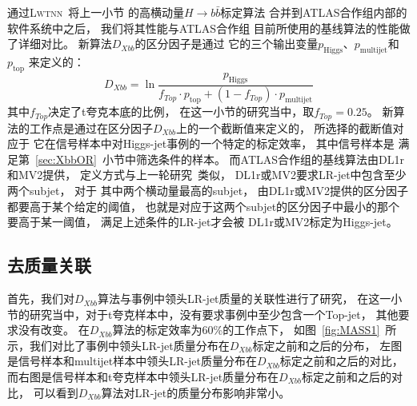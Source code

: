 通过\textsc{Lwtnn}~\cite{lwtnn}将上一小节
的高横动量$H\rightarrow b\bar{b}$标定算法
合并到ATLAS合作组内部的软件系统中之后，
我们将其性能与ATLAS合作组
目前所使用的基线算法的性能做了详细对比。
新算法$D_{Xbb}$的区分因子是通过
它的三个输出变量$p_{\text{Higgs}}$、$p_{\text{multijet}}$和$p_{\text{top}}$
来定义的：
\begin{equation} 
\label{eq:discr}
D_{Xbb} = \ln\frac{p_{\text{Higgs}}}{f_{Top}\cdot p_{\text{top}} + (1-f_{Top})\cdot p_{\text{multijet}}} %
\end{equation}
其中$f_{Top}$决定了t夸克本底的比例，
在这一小节的研究当中，取$f_{Top}=0.25$。
新算法的工作点是通过在区分因子$D_{Xbb}$上的一个截断值来定义的，
所选择的截断值对应于
它在信号样本中对Higgs-jet事例的一个特定的标定效率，
其中信号样本是
满足第~\ref{sec:XbbOR}~小节中筛选条件的样本。
而ATLAS合作组的基线算法由DL1r和MV2提供，
定义方式与上一轮研究~\cite{TAGGING5}类似，
DL1r或MV2要求LR-jet中包含至少两个subjet，
对于
其中两个横动量最高的subjet，
由DL1r或MV2提供的区分因子都要高于某个给定的阈值，
也就是对应于这两个subjet的区分因子中最小的那个要高于某一阈值，
满足上述条件的LR-jet才会被
DL1r或MV2标定为Higgs-jet。

\subsection{去质量关联}
\label{sec:XbbPerf1}
首先，我们对$D_{Xbb}$算法与事例中领头LR-jet质量的关联性进行了研究，
在这一小节的研究当中，对于t夸克样本中，没有要求事例中至少包含一个Top-jet，
其他要求没有改变。
在$D_{Xbb}$算法的标定效率为60\%的工作点下，
如图~\ref{fig:MASS1}~所示，我们对比了事例中领头LR-jet质量分布在$D_{Xbb}$标定之前和之后的分布，
左图是信号样本和multijet样本中领头LR-jet质量分布在$D_{Xbb}$标定之前和之后的对比，
而右图是信号样本和t夸克样本中领头LR-jet质量分布在$D_{Xbb}$标定之前和之后的对比，
可以看到$D_{Xbb}$算法对LR-jet的质量分布影响非常小。

